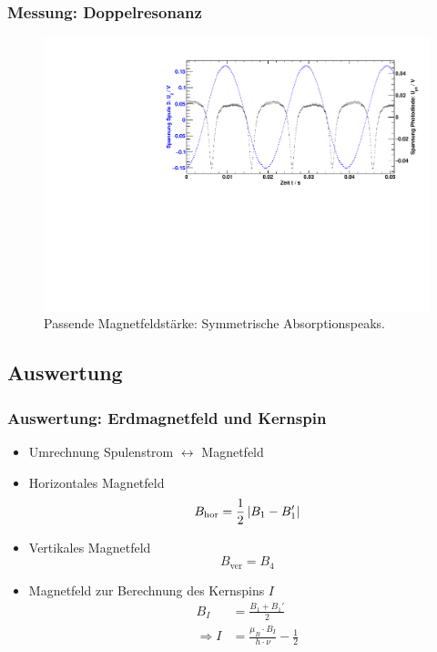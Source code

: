 \begin{frame}
\frametitle{Messung: Doppelresonanz}
\begin{figure}
    \begin{center}
        \includegraphics[width=\textwidth]{../img/08.pdf}
        \caption{Passende Magnetfeldstärke: Symmetrische Absorptionspeaks.}
        \label{img:rfcorrect}
    \end{center}
\end{figure}
\end{frame}



\subsection{Auswertung}
\begin{frame}
\frametitle{Auswertung: Erdmagnetfeld und Kernspin}
\begin{itemize}[<+->]
    \item Umrechnung Spulenstrom $\leftrightarrow$ Magnetfeld
    \item Horizontales Magnetfeld
    \begin{equation*}
        B_\text{hor} = \frac{1}{2} \left|B_1 - B_1'\right|
    \end{equation*}
    \item Vertikales Magnetfeld
    \begin{equation*}
        B_\text{ver} = B_4
    \end{equation*}
    \item Magnetfeld zur Berechnung des Kernspins $I$
    \begin{equation*}
        \begin{split}
            B_I &= \frac{B_1 + B_1'}{2} \\
            \Rightarrow I &= \frac{\mu_B \cdot B_I}{h \cdot \nu} - \frac{1}{2}
        \end{split}
    \end{equation*}
\end{itemize}
\end{frame}


